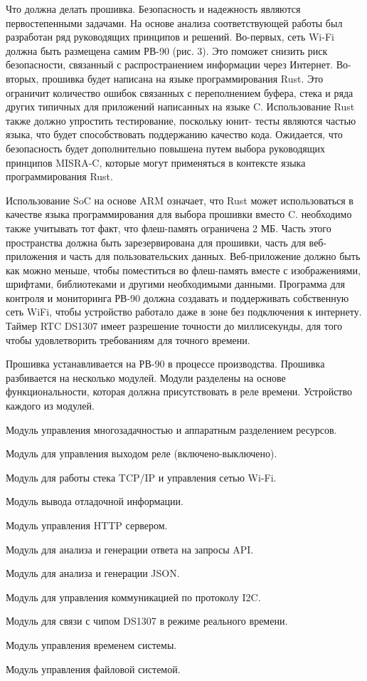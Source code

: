 Что должна делать прошивка.
Безопасность и надежность являются первостепенными задачами. На основе анализа соответствующей работы был разработан ряд руководящих принципов и решений. Во-первых, сеть Wi-Fi должна быть размещена самим РВ-90 (рис. 3). Это поможет снизить риск безопасности, связанный с распространением информации через Интернет. Во-вторых, прошивка будет написана на языке программирования Rust. Это ограничит количество ошибок связанных с переполнением буфера, стека и ряда других типичных для приложений написанных на языке C. Использование Rust также должно упростить тестирование, поскольку юнит- тесты являются частью языка, что будет способствовать поддержанию качество кода. Ожидается, что безопасность будет дополнительно повышена путем выбора руководящих принципов MISRA-C, которые могут применяться в контексте языка программирования Rust. 

Использование SoC на основе ARM означает, что Rust может использоваться в качестве языка программирования для выбора прошивки вместо C. необходимо также учитывать тот факт, что флеш-память ограничена 2 МБ. Часть этого пространства должна быть зарезервирована для прошивки, часть для веб-приложения и часть для пользовательских данных. Веб-приложение должно быть как можно меньше, чтобы поместиться во флеш-память вместе с изображениями, шрифтами, библиотеками и другими необходимыми данными. Программа для контроля и мониторинга РВ-90 должна создавать и поддерживать собственную сеть WiFi, чтобы устройство работало даже в зоне без подключения к интернету. Таймер RTC DS1307 имеет разрешение точности до миллисекунды, для того чтобы удовлетворить требованиям для точного времени.

Прошивка устанавливается на РВ-90 в процессе производства.  Прошивка разбивается на несколько модулей. Модули разделены на основе функциональности, которая должна присутствовать в реле времени. Устройство каждого из модулей.

\begin{my_itemize}
\item Модуль управления многозадачностью и аппаратным разделением ресурсов.
\item Модуль для управления выходом реле (включено-выключено).
\item Модуль для работы стека TCP/IP и управления сетью Wi-Fi.
\item Модуль вывода отладочной информации.
\item Модуль управления HTTP сервером.
\item Модуль для анализа и генерации ответа на запросы API.
\item Модуль для анализа и генерации JSON.
\item Модуль для управления коммуникацией по протоколу I2C.
\item Модуль для связи с чипом DS1307 в режиме реального времени.
\item Модуль управления временем системы.
\item Модуль управления файловой системой.
\end{my_itemize}



